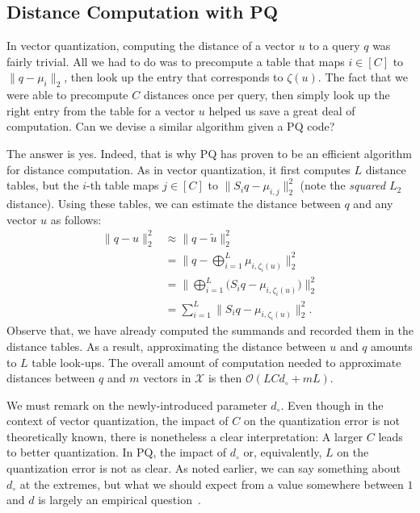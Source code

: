 \subsection{Distance Computation with PQ}
In vector quantization, computing the distance of a vector $u$ to a query $q$
was fairly trivial. All we had to do was to precompute a table that maps
$i \in [C]$ to $\lVert q - \mu_i \rVert_2$, then look up the entry that corresponds to $\zeta(u)$.
The fact that we were able to precompute $C$ distances once per query, then simply look up
the right entry from the table for a vector $u$ helped us save a great deal of computation.
Can we devise a similar algorithm given a PQ code?

The answer is yes. Indeed, that is why PQ has proven to be an efficient
algorithm for distance computation. As in vector quantization, it first computes
$L$ distance tables, but the $i$-th table maps $j \in [C]$ to $\lVert S_i q - \mu_{i,j} \rVert_2^2$
(note the \emph{squared} $L_2$ distance). Using these tables, we can estimate the distance
between $q$ and any vector $u$ as follows:
\begin{align*}
    \lVert q - u \rVert_2^2 &\approx \lVert q - \tilde{u} \rVert_2^2 \\
    &= \lVert q - \bigoplus_{i=1}^L \mu_{i, \zeta_i(u)} \rVert_2^2 \\
    &= \lVert \bigoplus_{i = 1}^L \Big( S_i q - \mu_{i, \zeta_i(u)} \Big) \rVert_2^2 \\
    &= \sum_{i = 1}^L \lVert S_i q - \mu_{i, \zeta_i(u)} \rVert_2^2.
\end{align*}
Observe that, we have already computed the summands and recorded them in the distance tables.
As a result, approximating the distance between $u$ and $q$ amounts to $L$ table look-ups.
The overall amount of computation needed to approximate distances between $q$ and
$m$ vectors in $\mathcal{X}$ is then $\mathcal{O}(LCd_\circ + mL)$.

\bigskip

We must remark on the newly-introduced parameter $d_\circ$.
Even though in the context of vector quantization, the impact of $C$
on the quantization error is not theoretically known, there is nonetheless
a clear interpretation: A larger $C$ leads to better quantization.
In PQ, the impact of $d_\circ$ or, equivalently, $L$ on the quantization error
is not as clear. As noted earlier, we can say something about $d_\circ$ at the extremes,
but what we should expect from a value somewhere between $1$ and $d$ is largely
an empirical question~\citep{sun2023automating}.


